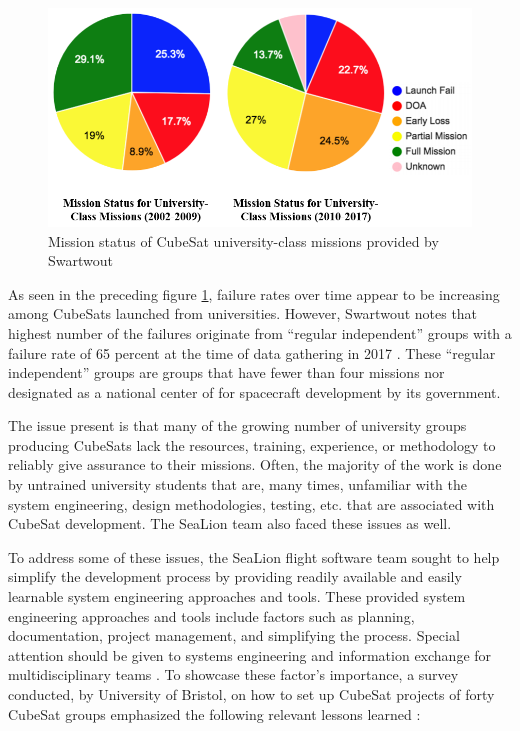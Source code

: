 \documentclass[journal,article,submit,pdftex,moreauthors]{Definitions/mdpi}
\begin{document}
\begin{figure}[H]
    \includegraphics[width=10.5 cm]{assets/mission_status.png}
    \caption{Mission status of CubeSat university-class missions provided by Swartwout}
	\label{fig:mission_status}
    \end{figure}
	\noindent   
\unskip

As seen in the preceding figure \ref{fig:mission_status}, failure rates over time appear to be increasing among CubeSats launched from universities.  However, Swartwout notes that highest number of the failures originate from “regular independent” groups with a failure rate of 65 percent at the time of data gathering in 2017 \cite{reliving_24}.  These “regular independent” groups are groups that have fewer than four missions nor designated as a national center of for spacecraft development by its government. 

The issue present is that many of the growing number of university groups producing CubeSats lack the resources, training, experience, or methodology to reliably give assurance to their missions.  Often, the majority of the work is done by untrained university students that are, many times, unfamiliar with the system engineering, design methodologies, testing, etc. that are associated with CubeSat development.  The SeaLion team also faced these issues as well.

To address some of these issues, the SeaLion flight software team sought to help simplify the development process by providing readily available and easily learnable system engineering approaches and tools.  These provided system engineering approaches and tools include factors such as planning, documentation, project management, and simplifying the process.  Special attention should be given to systems engineering and information exchange for multidisciplinary teams \cite{aalto}.  To showcase these factor's importance, a survey conducted, by University of Bristol, on how to set up CubeSat projects of forty CubeSat groups emphasized the following relevant lessons learned \cite{howtosetup}:
\end{document}
